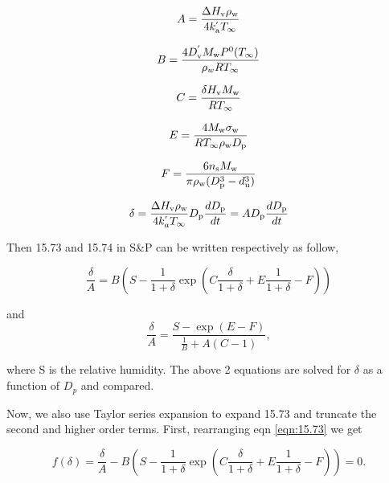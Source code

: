 \documentclass[12pt]{article}
\begin{document}
\begin{equation}
A=\frac{\Delta H_{\rm v} \rho_{\rm w}}{4 k_{\rm a}^{'} T_{\infty}}
\end{equation}

\begin{equation}
B=\frac{4 D_{\rm v}^{'} M_{\rm w} P^{\rm 0}(T_{\infty})}{\rho_w R T_{\infty}}
\end{equation}

\begin{equation}
C=\frac{\delta H_{\rm v} M_{\rm w}}{R T_{\infty}}
\end{equation}

\begin{equation}
E=\frac{4 M_{\rm w}\sigma_{\rm w}}{R T_{\infty} \rho_{\rm w} D_{\rm p}}
\end{equation}

\begin{equation}
F=\frac{6 n_{\rm s} M_{\rm w}}{\pi \rho_{\rm w} (D_{\rm p}^{3}-d_{\rm u}^{3})}
\end{equation}

\begin{equation}\label{eqn:23}
\delta=\frac{\Delta H_{\rm v} \rho_{\rm w}}{4 k_a^{'} T_{\infty}} D_{\rm p} \frac{d D_{\rm p}}{dt}=A D_{\rm p} \frac{d D_{\rm p}}{dt}
\end{equation}

Then 15.73 and 15.74 in S\&P can be written respectively as follow,

\begin{equation}\label{eqn:15.73}
\frac{\delta}{A}=B(S-\frac{1}{1+\delta}\exp(C\frac{\delta}{1+\delta}+E \frac{1}{1+\delta}-F))
\end{equation}

and 
\begin{equation}\label{eqn:15.74}
\frac{\delta}{A}=\frac{S-\exp(E-F)}{\frac{1}{B}+A(C-1)},
\end{equation}

where S is the relative humidity. The above 2 equations are solved for $\delta$ as a function of $D_{p}$ and compared. 

Now, we also use Taylor series expansion to expand 15.73 and truncate the second and higher order terms. First, rearranging  eqn \ref{eqn:15.73} we get


\begin{equation}
f(\delta)=\frac{\delta}{A}-B(S-\frac{1}{1+\delta}\exp(C\frac{\delta}{1+\delta}+E \frac{1}{1+\delta}-F))=0.
\end{equation}
\end{document}
